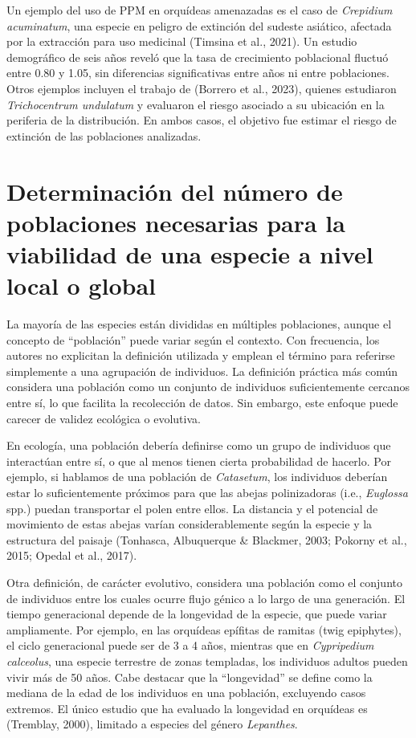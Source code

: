 \documentclass[
  12pt,
  letterpaper,
]{book}
\begin{document}
Un ejemplo del uso de PPM en orquídeas amenazadas es el caso de
\emph{Crepidium acuminatum}, una especie en peligro de extinción del
sudeste asiático, afectada por la extracción para uso medicinal (Timsina
et al., 2021). Un estudio demográfico de seis años reveló que la tasa de
crecimiento poblacional fluctuó entre 0.80 y 1.05, sin diferencias
significativas entre años ni entre poblaciones. Otros ejemplos incluyen
el trabajo de (Borrero et al., 2023), quienes estudiaron
\emph{Trichocentrum undulatum} y evaluaron el riesgo asociado a su
ubicación en la periferia de la distribución. En ambos casos, el
objetivo fue estimar el riesgo de extinción de las poblaciones
analizadas.

\section{Determinación del número de poblaciones necesarias para la
viabilidad de una especie a nivel local o
global}\label{determinaciuxf3n-del-nuxfamero-de-poblaciones-necesarias-para-la-viabilidad-de-una-especie-a-nivel-local-o-global}

La mayoría de las especies están divididas en múltiples poblaciones,
aunque el concepto de ``población'' puede variar según el contexto. Con
frecuencia, los autores no explicitan la definición utilizada y emplean
el término para referirse simplemente a una agrupación de individuos. La
definición práctica más común considera una población como un conjunto
de individuos suficientemente cercanos entre sí, lo que facilita la
recolección de datos. Sin embargo, este enfoque puede carecer de validez
ecológica o evolutiva.

En ecología, una población debería definirse como un grupo de individuos
que interactúan entre sí, o que al menos tienen cierta probabilidad de
hacerlo. Por ejemplo, si hablamos de una población de \emph{Catasetum},
los individuos deberían estar lo suficientemente próximos para que las
abejas polinizadoras (i.e., \emph{Euglossa} spp.) puedan transportar el
polen entre ellos. La distancia y el potencial de movimiento de estas
abejas varían considerablemente según la especie y la estructura del
paisaje (Tonhasca, Albuquerque \& Blackmer, 2003; Pokorny et al., 2015;
Opedal et al., 2017).

Otra definición, de carácter evolutivo, considera una población como el
conjunto de individuos entre los cuales ocurre flujo génico a lo largo
de una generación. El tiempo generacional depende de la longevidad de la
especie, que puede variar ampliamente. Por ejemplo, en las orquídeas
epífitas de ramitas (twig epiphytes), el ciclo generacional puede ser de
3 a 4 años, mientras que en \emph{Cypripedium calceolus}, una especie
terrestre de zonas templadas, los individuos adultos pueden vivir más de
50 años. Cabe destacar que la ``longevidad'' se define como la mediana
de la edad de los individuos en una población, excluyendo casos
extremos. El único estudio que ha evaluado la longevidad en orquídeas es
(Tremblay, 2000), limitado a especies del género \emph{Lepanthes}.
\end{document}
